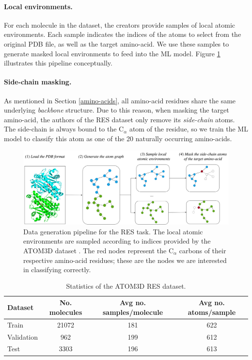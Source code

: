 \paragraph{Local environments.} For each molecule in the dataset, the creators provide samples of local atomic environments. Each sample indicates the indices of the atoms to select from the original PDB file, as well as the target amino-acid.
We use these samples to generate masked local environments to feed into the ML model. Figure \ref{protein_pipeline} illustrates this pipeline conceptually. 

\paragraph{Side-chain masking.} As mentioned in Section \ref{amino-acids}, all amino-acid residues share the same underlying \textit{backbone} structure. Due to this reason, when masking the target amino-acid, the authors of the RES dataset only remove its \textit{side-chain} atoms. The side-chain is always bound to the $\text{C}_{\alpha}$ atom of the residue, so we train the ML model to classify this atom as one of the 20 naturally occurring amino-acids.


\begin{figure}
    \centering
    \includegraphics[width=\textwidth]{masters-report/figures/data_pipeline.png}
    \caption{Data generation pipeline for the RES task. The local atomic environments are sampled according to indices provided by the ATOM3D dataset \cite{atom-3d}. The red nodes represent the $\text{C}_{\alpha}$ carbons of their respective amino-acid residues; these are the nodes we are interested in classifying correctly.}
    \label{protein_pipeline}
\end{figure}

\begin{table}[]
    \centering
    \begin{tabular}{@{}lccc@{}}
    \toprule
    Dataset    & No. molecules & Avg no. samples/molecule & Avg no. atoms/sample \\ \midrule
    Train      & 21072           & 181                       & 622                   \\
    Validation & 962             & 199                       & 612                   \\
    Test       & 3303            & 196                       & 613                   \\ \bottomrule
    \end{tabular}
    \caption{Statistics of the ATOM3D RES dataset.}
    \label{dataset_stats}
\end{table}

